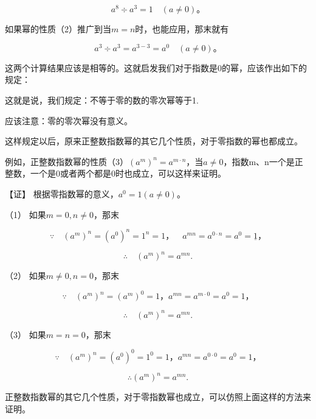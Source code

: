 \[
a ^ {8} \div a ^ {3} = 1 \quad (a \neq 0)\text{。}
\]

如果幂的性质（2）推广到当\(m = n\)时，也能应用，那末就有

\[
a ^ {3} \div a ^ {3} = a ^ {3 - 3} = a ^ {0} \quad (a \neq 0)\text{。}
\]

这两个计算结果应该是相等的。这就启发我们对于指数是0的幂，应该作出如下的规定：

\begin{figure}
\centering
{}
\end{figure}

这就是说，我们规定：不等于零的数的零次幂等于1.

应该注意：零的零次幂没有意义。

这样规定以后，原来正整数指数幂的其它几个性质，对于零指数的幂也都成立。

例如，正整数指数幂的性质（3）\((a^{m})^{n}=a^{m\cdot n}\)，当\(a\neq0\)，指数m、n一个是正整数，一个是0或者两个都是0时也成立，可以这样来证明。

【证】 根据零指数幂的意义，\(a^0 = 1 (a \neq 0)\)。

（1） 如果\(m = 0, n \neq 0\)，那末

\[
\because \quad (a ^ {m}) ^ {n} = (a ^ {0}) ^ {n} = 1 ^ {n} = 1\text{，} \quad a ^ {m n} = a ^ {0 \cdot n} = a ^ {0} = \underline {{1}}\text{，}
\]

\[
\therefore \quad (a ^ {m}) ^ {n} = a ^ {m n}.
\]

（2） 如果\(m \neq 0, n = 0\)，那末

\[
\because \quad (a ^ {m}) ^ {n} = (a ^ {m}) ^ {0} = 1\text{，} a ^ {m n} = a ^ {m \cdot 0} = a ^ {0} = 1\text{，}
\]

\[
\therefore \quad (a ^ {m}) ^ {n} = a ^ {m n}.
\]

（3） 如果\(m = n = 0\)，那末

\[
\because \quad (a ^ {m}) ^ {n} = (a ^ {0}) ^ {0} = 1 ^ {0} = 1\text{，} a ^ {m n} = a ^ {0 \cdot 0} = a ^ {0} = 1\text{，}
\]

\[
\therefore (a ^ {m}) ^ {n} = a ^ {m n}.
\]

正整数指数幂的其它几个性质，对于零指数幂也成立，可以仿照上面这样的方法来证明。

